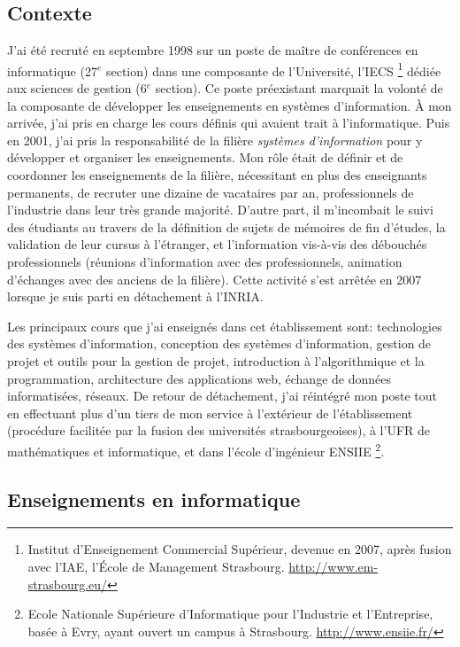 \documentclass[11pt]{article}
\begin{document}
\subsection{Contexte}

\noindent
J'ai été recruté en septembre 1998 sur un poste de maître de conférences 
en informatique (27$^e$ section) dans une composante de l'Université, l'IECS%
\footnote{Institut d'Enseignement Commercial Supérieur, devenue en 2007, après 
fusion avec l'IAE, l'\'Ecole de Management Strasbourg. \url{http://www.em-strasbourg.eu/}}
dédiée aux sciences de gestion (6$^e$ section). 
Ce poste préexistant marquait la volonté de la composante de développer les 
enseignements en systèmes d'information. \`A mon arrivée, j'ai pris en charge les cours
définis qui avaient trait à l'informatique. 
Puis en 2001, j'ai pris la responsabilité de la filière \textit{systèmes d'information} 
pour y développer et organiser les enseignements.
Mon rôle était de définir et de coordonner les enseignements de la filière, nécessitant
en plus des enseignants permanents, de recruter une dizaine de vacataires par an, 
professionnels de l'industrie dans leur très grande majorité. D'autre part, il m'incombait
le suivi des étudiants au travers de la définition de sujets de mémoires de fin d'études,
la validation de leur cursus à l'étranger, et l'information vis-à-vis des débouchés 
professionnels (réunions d'information avec des professionnels, animation d'échanges
avec des anciens de la filière).
Cette activité s'est arrêtée en 2007 lorsque je suis parti en détachement à l'INRIA.


Les principaux cours que j'ai enseignés dans cet établissement sont:
technologies des systèmes d'information, 
conception des systèmes d'information,
gestion de projet et outils pour la gestion de projet,
introduction à l'algorithmique et la programmation, 
architecture des applications web,
échange de données informatisées,
réseaux.
De retour de détachement, j'ai réintégré mon poste tout en effectuant plus d'un tiers
de mon service à l'extérieur de l'établissement (procédure facilitée par la fusion des 
universités strasbourgeoises), 
à l'UFR de mathématiques et informatique, et dans l'école d'ingénieur ENSIIE
\footnote{Ecole Nationale Supérieure d'Informatique pour l'Industrie et l'Entreprise, 
basée à Evry, ayant ouvert un campus à Strasbourg. \url{http://www.ensiie.fr/}}.


\subsection{Enseignements en informatique}
\end{document}
